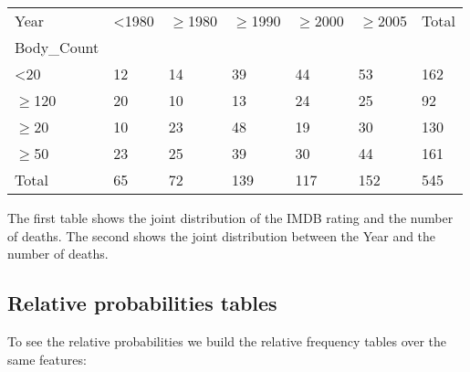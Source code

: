 \documentclass[a4paper,14pt]{article}
\renewcommand{\geq}{\ensuremath{\geqslant}}
\begin{document}
\begin{table}[]
	\begin{tabular}{lllllll}
		Year          & \textless{}1980 & $\geq$1980 & $\geq$1990 & $\geq$2000 & $\geq$2005 & Total \\
		Body\_Count   &                 &       &       &       &       &       \\
		\textless{}20 & 12              & 14    & 39    & 44    & 53    & 162   \\
		$\geq$120          & 20              & 10    & 13    & 24    & 25    & 92    \\
		$\geq$20           & 10              & 23    & 48    & 19    & 30    & 130   \\
		$\geq$50           & 23              & 25    & 39    & 30    & 44    & 161   \\
		Total         & 65              & 72    & 139   & 117   & 152   & 545  
	\end{tabular}
\end{table}
  \normalsize 
   
 The first table shows the joint distribution of the IMDB rating and the number of deaths.  The second shows the   joint distribution between the Year and the number of deaths.
 
 \subsection{Relative probabilities tables}
 
 To see the relative probabilities we build the relative frequency tables over the same features: 
 
\end{document}
